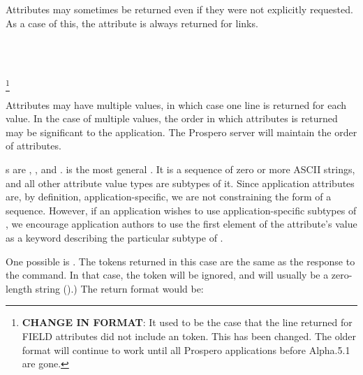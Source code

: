 Attributes may sometimes be returned even if they were not explicitly
requested.  As a case of this, the  attribute is
always returned for  links.

\begin{command}
  \ors {}  
	  
	\ooms{}\oome%
\\
\metaor \\
  
	\ors {} \metaor {} \ore
	 
	\ooms{}\oome \ore
\end{command}
\footnote{{\bf CHANGE IN FORMAT}:  It used to be the case that the
  line returned for FIELD attributes did not include an
   token.  This has been changed.  The older
   format will continue to work until all Prospero applications before
Alpha.5.1 are gone.
}

Attributes may have multiple values, in which case one 
line is returned for each value.  In the case of multiple values, the
order in which attributes is returned may be significant to the
application.  The Prospero server will maintain the order
of attributes.  

s are ,
, and .   is the most general
.  It is  a sequence of zero or more ASCII
strings, and all other attribute value types are subtypes of it.
Since application attributes are, by definition, application-specific,
we are not constraining the form of a sequence.  However, if an
application wishes to use application-specific subtypes of
, we encourage application authors to use the first
element of the attribute's value as a keyword describing the particular
subtype of .  

One possible  is .    The
 tokens returned in this case are the same as
the  response to the  command. 
In that
case, the  token will be ignored, and will usually be
a zero-length string ().)  The return format would be:

\begin{command}
     
	 \ors {} \metaor {}\ore {}    
	  
	 \zoos {}  \zooe 
\end{command}


